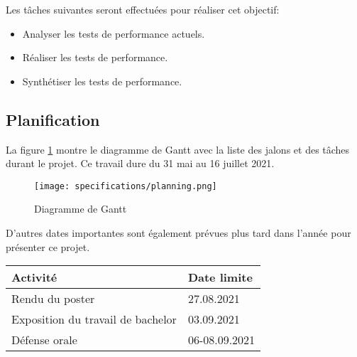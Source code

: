 Les tâches suivantes seront effectuées pour réaliser cet objectif:
\begin{itemize}
    \item Analyser les tests de performance actuels.
    \item Réaliser les tests de performance.
    \item Synthétiser les tests de performance.
\end{itemize}

\begin{landscape}
\section{Planification}
La figure \ref{fig:gantt} montre le diagramme de Gantt avec la liste des jalons et des tâches durant le projet. Ce travail dure du 31 mai au 16 juillet 2021.
\begin{figure}[h!]
   \centering
    \texttt{[image: specifications/planning.png]}
    \caption{Diagramme de Gantt}
    \label{fig:gantt}
\end{figure}

D'autres dates importantes sont également prévues plus tard dans l'année pour présenter ce projet.

\begin{table}[ht]
    \begin{tabularx}{\columnwidth}{ | X | p{8em} |}
        \hline
        \textbf{Activité} & \textbf{Date limite} \\
        \hline
        Rendu du poster & 27.08.2021 \\
        Exposition du travail de bachelor & 03.09.2021 \\
        Défense orale & 06-08.09.2021 \\
        \hline
    \end{tabularx}
\end{table}

\end{landscape} 